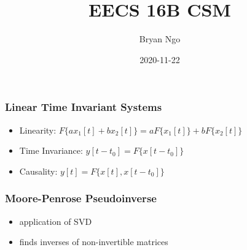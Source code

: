 \documentclass[aspectratio=169]{beamer}
\title{EECS 16B CSM}
\author{Bryan Ngo}
\date{2020-11-22}
\institute{UC Berkeley}
\begin{document}
\begin{frame}
    \maketitle
\end{frame}

\begin{frame}
    \frametitle{Linear Time Invariant Systems}

    \begin{itemize}
        \item Linearity: \(F\{a x_1[t] + b x_2[t]\} = a F\{x_1[t]\} + b F\{x_2[t]\}\)
        \item Time Invariance: \(y[t - t_0] = F\{x[t - t_0]\}\)
        \item Causality: \(y[t] = F\{x[t], x[t - t_0]\}\)
    \end{itemize}
\end{frame}

\begin{frame}
    \frametitle{Moore-Penrose Pseudoinverse}

    \begin{itemize}
        \item application of SVD
        \item finds inverses of non-invertible matrices
    \end{itemize}
\end{frame}
\end{document}
